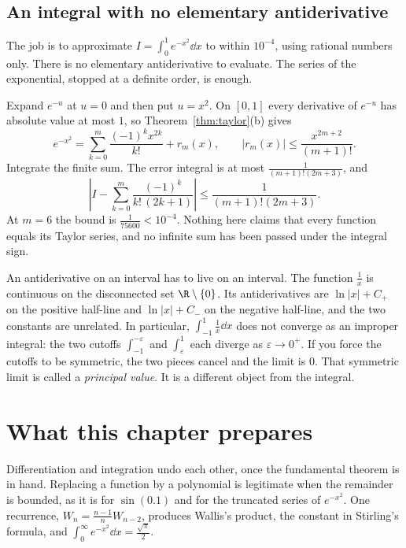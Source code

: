 \subsection*{An integral with no elementary antiderivative}
The job is to approximate $I=\int_0^1 e^{-x^2}\dd x$ to within $10^{-4}$, using rational numbers only. There is no elementary antiderivative to evaluate. The series of the exponential, stopped at a definite order, is enough.

Expand $e^{-u}$ at $u=0$ and then put $u=x^2$. On $[0,1]$ every derivative of $e^{-u}$ has absolute value at most $1$, so Theorem~\ref{thm:taylor}(b) gives
\[
e^{-x^2}=\sum_{k=0}^m\frac{(-1)^k x^{2k}}{k!}+r_m(x),
\qquad |r_m(x)|\le\frac{x^{2m+2}}{(m+1)!}.
\]
Integrate the finite sum. The error integral is at most $\frac1{(m+1)!(2m+3)}$, and
\[
\left|I-\sum_{k=0}^m\frac{(-1)^k}{k!\,(2k+1)}\right|\le\frac1{(m+1)!(2m+3)}.
\]
At $m=6$ the bound is $\frac1{75600}<10^{-4}$. Nothing here claims that every function equals its Taylor series, and no infinite sum has been passed under the integral sign.

\begin{remark}
An antiderivative on an interval has to live on an interval. The function $\frac1x$ is continuous on the disconnected set $\R\setminus\{0\}$. Its antiderivatives are $\ln|x|+C_+$ on the positive half-line and $\ln|x|+C_-$ on the negative half-line, and the two constants are unrelated. In particular, $\int_{-1}^1\frac1x\dd x$ does not converge as an improper integral: the two cutoffs $\int_{-1}^{-\varepsilon}$ and $\int_{\varepsilon}^1$ each diverge as $\varepsilon\to0^+$. If you force the cutoffs to be symmetric, the two pieces cancel and the limit is $0$. That symmetric limit is called a \emph{principal value}. It is a different object from the integral.
\end{remark}


\section*{What this chapter prepares}
Differentiation and integration undo each other, once the fundamental theorem is in hand. Replacing a function by a polynomial is legitimate when the remainder is bounded, as it is for $\sin(0.1)$ and for the truncated series of $e^{-x^2}$. One recurrence, $W_n=\frac{n-1}n W_{n-2}$, produces Wallis's product, the constant in Stirling's formula, and $\int_0^\infty e^{-x^2}\dd x=\frac{\sqrt\pi}2$.

